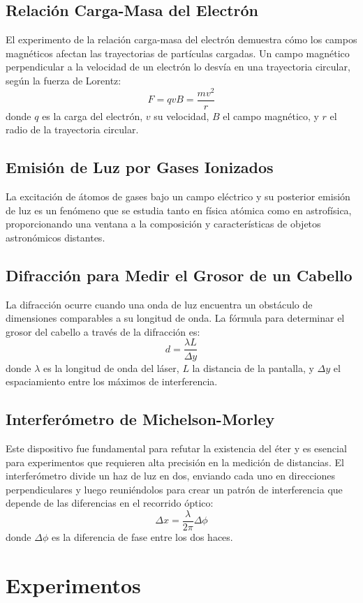 \subsection{Relación Carga-Masa del Electrón}
El experimento de la relación carga-masa del electrón demuestra cómo los campos magnéticos afectan las trayectorias de partículas cargadas. Un campo magnético perpendicular a la velocidad de un electrón lo desvía en una trayectoria circular, según la fuerza de Lorentz:
\[
F = qvB = \frac{mv^2}{r}
\]
donde \(q\) es la carga del electrón, \(v\) su velocidad, \(B\) el campo magnético, y \(r\) el radio de la trayectoria circular.

\subsection{Emisión de Luz por Gases Ionizados}
La excitación de átomos de gases bajo un campo eléctrico y su posterior emisión de luz es un fenómeno que se estudia tanto en física atómica como en astrofísica, proporcionando una ventana a la composición y características de objetos astronómicos distantes.

\subsection{Difracción para Medir el Grosor de un Cabello}
La difracción ocurre cuando una onda de luz encuentra un obstáculo de dimensiones comparables a su longitud de onda. La fórmula para determinar el grosor del cabello a través de la difracción es:
\[
d = \frac{\lambda L}{\Delta y}
\]
donde \(\lambda\) es la longitud de onda del láser, \(L\) la distancia de la pantalla, y \(\Delta y\) el espaciamiento entre los máximos de interferencia.

\subsection{Interferómetro de Michelson-Morley}
Este dispositivo fue fundamental para refutar la existencia del éter y es esencial para experimentos que requieren alta precisión en la medición de distancias. El interferómetro divide un haz de luz en dos, enviando cada uno en direcciones perpendiculares y luego reuniéndolos para crear un patrón de interferencia que depende de las diferencias en el recorrido óptico:
\[
\Delta x = \frac{\lambda}{2\pi} \Delta \phi
\]
donde \(\Delta \phi\) es la diferencia de fase entre los dos haces.


\section{Experimentos}
